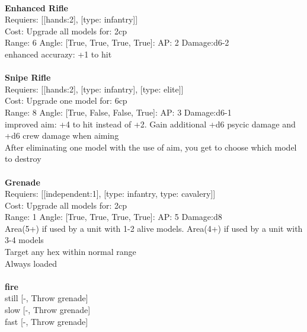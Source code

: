\ \\
{\bf Enhanced Rifle } \\

Requiers: [[hands:2], [type: infantry]] \\
Cost: Upgrade all models for: 2cp \\


Range: 6  Angle: [True, True, True, True]: AP: 2 Damage:d6-2 \\
enhanced accurazy: +1 to hit\\ 








\ \\
{\bf Snipe Rifle } \\

Requiers: [[hands:2], [type: infantry], [type: elite]] \\
Cost: Upgrade one model for: 6cp \\


Range: 8  Angle: [True, False, False, True]: AP: 3 Damage:d6-1 \\
improved aim: +4 to hit instead of +2. Gain additional +d6 psycic damage and +d6 crew damage when aiming\\ 
After eliminating one model with the use of aim, you get to choose which model to destroy\\ 








\ \\
{\bf Grenade } \\

Requiers: [[independent:1], [type: infantry, type: cavalery]] \\
Cost: Upgrade all models for: 2cp \\


Range: 1  Angle: [True, True, True, True]: AP: 5 Damage:d8 \\
Area(5+) if used by a unit with 1-2 alive models. Area(4+) if used by a unit with 3-4 models\\ 
Target any hex within normal range\\ 
Always loaded\\ 







\ \\ {\bf fire } \\
still [-, Throw grenade] \\
slow [-, Throw grenade] \\
fast [-, Throw grenade] \\

